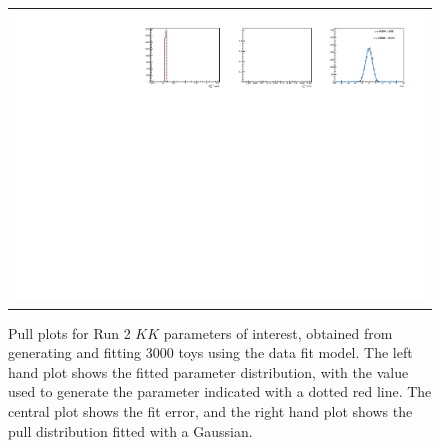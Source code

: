\begin{figure}
\begin{tabular}{c}
\includegraphics[width=\textwidth]{ANA_resources/Plots/Data_fit/FitterBias//R_ds_KK_run2.pdf} \\
  \end{tabular}
  \caption{Pull plots for Run 2 $KK$ parameters of interest, obtained from generating and fitting 3000 toys using the data fit model. The left hand plot shows the fitted parameter distribution, with the value used to generate the parameter indicated with a dotted red line. The central plot shows the fit error, and the right hand plot shows the pull distribution fitted with a Gaussian.}
\label{fig:KK_run2_pulls}
\end{figure}
